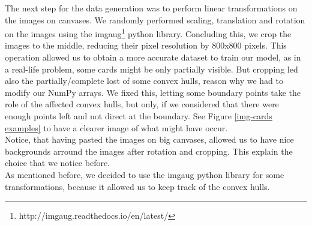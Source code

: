 \documentclass[a4paper]{article}
\begin{document}
\newline \newline\newline 
\noindent The next step for the data generation was to perform linear transformations on the images on canvases.  We randomly performed scaling, translation and rotation on the images using the imgaug\footnote{http://imgaug.readthedocs.io/en/latest/} python library.  Concluding this, we crop the images to the middle, reducing their pixel resolution by 800x800 pixels.  This operation allowed us to obtain a more accurate dataset to train our model, as in a real-life problem, some cards might be only partially visible.  But cropping led also the partially/complete lost of some convex hulls, reason why we had to modify our NumPy arrays.  We fixed this, letting some boundary points take the role of the affected convex hulls, but only, if we considered that there were enough points left and not direct at the boundary.  
See Figure \ref{img-cards examples} to have a clearer image of what might have occur. \\ Notice, that having pasted the images on big canvases, allowed us to have nice backgrounds arround the images after rotation and cropping.  This explain the choice that we notice before.\\
As mentioned before, we decided to use the imgaug python library for some transformations, because it allowed us to keep track of the convex hulls.
\end{document}
